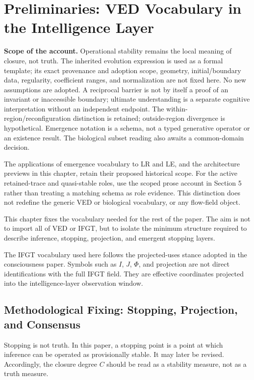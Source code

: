 \section{Preliminaries: VED Vocabulary in the Intelligence Layer}

\noindent\textbf{Scope of the account.} Operational stability remains the local meaning of closure, not truth. The inherited evolution expression is used as a formal template; its exact provenance and adoption scope, geometry, initial/boundary data, regularity, coefficient ranges, and normalization are not fixed here. No new assumptions are adopted. A reciprocal barrier is not by itself a proof of an invariant or inaccessible boundary; ultimate understanding is a separate cognitive interpretation without an independent endpoint. The within-region/reconfiguration distinction is retained; outside-region divergence is hypothetical. Emergence notation is a schema, not a typed generative operator or an existence result. The biological subset reading also awaits a common-domain decision.

The applications of emergence vocabulary to LR and LE, and the architecture previews in this chapter, retain their proposed historical scope. For the active retained-trace and quasi-stable roles, use the scoped prose account in Section 5 rather than treating a matching schema as role evidence. This distinction does not redefine the generic VED or biological vocabulary, or any flow-field object.


This chapter fixes the vocabulary needed for the rest of the paper. The aim is not to import all of VED or IFGT, but to isolate the minimum structure required to describe inference, stopping, projection, and emergent stopping layers.

The IFGT vocabulary used here follows the projected-uses stance adopted in the consciousness paper. Symbols such as $I$, $J$, $\Phi$, and projection are not direct identifications with the full IFGT field. They are effective coordinates projected into the intelligence-layer observation window.

\subsection{Methodological Fixing: Stopping, Projection, and Consensus}

Stopping is not truth. In this paper, a stopping point is a point at which inference can be operated as provisionally stable. It may later be revised. Accordingly, the closure degree $C$ should be read as a stability measure, not as a truth measure.

